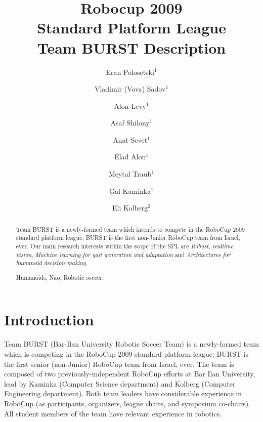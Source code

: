 \documentclass[runningheads,a4paper]{llncs}
\newcommand{\keywords}[1]{\par\addvspace\baselineskip
\noindent\keywordname\enspace\ignorespaces#1}
\begin{document}
\mainmatter  %

\title{Robocup 2009\\Standard Platform League\\Team BURST Description}


\author{Eran Polosetski$^1$\and Vladimir (Vova) Sadov$^1$\and
Alon Levy$^1$\and Asaf Shilony$^1$\and Anat Sevet$^1$\and Elad Alon$^1$\and Meytal Traub$^1$ \and Gal Kaminka$^1$ \and Eli Kolberg$^2$ }
%


%
%

\maketitle


\begin{abstract}
Team BURST is a newly-formed team which intends to compete in the RoboCup
2009 standard platform league. BURST is the first non-Junior RoboCup team from Israel, ever. Our main research interests within the scope of the SPL are \emph{Robust, realtime vision}, \emph{Machine learning for gait generation and adaptation} and \emph{Architectures for humanoid decision-making}.


\keywords{Humanoids, Nao, Robotic soccer.}
\end{abstract}


\section{Introduction}
Team BURST (Bar-Ilan University Robotic Soccer Team) is a newly-formed team which is competing in the RoboCup 2009 standard platform league. BURST is the first senior (non-Junior) RoboCup team from Israel, ever. The team is composed of two previously-independent RoboCup efforts at Bar Ilan University, lead by Kaminka (Computer Science department) and Kolberg (Computer Engineering department). Both team leaders have considerable experience in RoboCup (as participants, organizers, league chairs, and symposium co-chairs). All student members of the team have relevant experience in robotics. 
\end{document}
